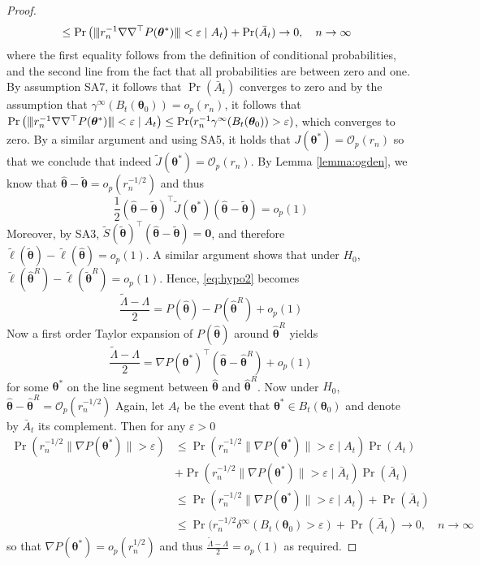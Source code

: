 \documentclass[11pt, a4paper]{article}
\newcommand*{\bb}{\boldsymbol}
\newcommand{\Op}[1]{\ensuremath{{\mathcal{O}_p(#1)}}}
\newcommand{\mnorms}[1]{{\vert\kern-0.25ex\vert\kern-0.25ex\vert #1 
		\vert\kern-0.25ex\vert\kern-0.25ex\vert}}
\theoremstyle{example} \newtheorem{example}{Example}[section]
\theoremstyle{theorem} \newtheorem{theorem}{Theorem}[section]
\theoremstyle{theorem }\newtheorem{proposition}{Proposition}[section]
\theoremstyle{theorem }\newtheorem{corollary}{Corollary}[section]
\def\\bbeta{\bb{\\bbeta}}
\def\btheta{\bb{\theta}}
\def\b0{\bb{0}}
\def\btnod{\bb{\theta}_0}
\def\bttilde{\tilde{\bb{\theta}}}
\begin{document}
\begin{proof}
\begin{equation}
\begin{aligned}
				&\leq 	\Pr\left(\mnorms{r_n^{-1}\nabla \nabla^\top P(\btheta^*)}<\varepsilon\mid A_t \right) + \Pr(\bar{A}_t) \to 0, \quad n \to \infty
			\end{aligned}
		\end{equation}
		where the first equality follows from the definition of conditional probabilities, and the second line from the fact that all probabilities are between zero and one. By assumption SA7, it follows that $\Pr(\bar{A}_t)$ converges to zero and by the assumption that $\gamma^\infty(B_t(\btnod)) = o_p(r_n)$, it follows that $\Pr\left(\mnorms{r_n^{-1}\nabla \nabla^\top P(\btheta^*)}<\varepsilon\mid A_t \right) \leq \Pr(r_n^{-1}\gamma^\infty(B_t(\btnod))>\varepsilon)$, which converges to zero. By a similar argument and using SA5, it holds that $J(\btheta^*) = \Op{r_n}$ so that we conclude that indeed $\tilde{J}(\btheta^*) = \Op{r_n}$. By Lemma \ref{lemma:ogden}, we know that $\hat{\btheta}-\bttilde = o_p(r_n^{-1/2})$ and thus 
		\begin{equation}
			\frac{1}{2} (\hat{\btheta}-\bttilde)^\top \tilde{J}(\btheta^*) (\hat{\btheta}-\bttilde) = o_p(1)
		\end{equation}
		Moreover, by SA3, $\tilde{S}(\bttilde)^\top(\hat{\btheta}-\bttilde) = \b0$, and therefore $	\tilde{\ell}(\tilde{\btheta}) - \tilde{\ell}(\hat{\btheta}) = o_p(1)$. A similar argument shows that under $H_0$, $\tilde{\ell}(\hat{\btheta}^R) - \tilde{\ell}(\tilde{\btheta}^R) =o_p(1)$. Hence, \eqref{eq:hypo2} becomes
		\begin{equation}
			\frac{\tilde{\Lambda}-\Lambda}{2} = P(\hat{\btheta})-P(\hat{\btheta}^R) + o_p(1)
		\end{equation}
		Now a first order Taylor expansion of $P(\hat{\btheta})$ around $\hat{\btheta}^R$ yields 
		\begin{equation}
			\frac{\tilde{\Lambda}-\Lambda}{2} = \nabla P(\btheta^*)^\top (\hat{\btheta}-\hat{\btheta}^R) + o_p(1)
		\end{equation}
		for some $\btheta^*$ on the line segment between $\hat{\btheta}$ and $\hat{\btheta}^R$. Now under $H_0$, $\hat{\btheta}-\hat{\btheta}^R = \Op{r_n^{-1/2}}$ Again, let $A_t$ be the event that $\btheta^* \in B_t(\btnod)$ and denote by $\bar{A}_t$ its complement. Then for any $\varepsilon>0$
		\begin{equation}
			\begin{aligned}
				\Pr(r_n^{-1/2}\|\nabla P(\btheta^*)  \| > \varepsilon) &\leq \Pr(r_n^{-1/2}\|\nabla P(\btheta^*)  \| > \varepsilon \mid A_t) \Pr(A_t) \\ 
				&+ \Pr(r_n^{-1/2}\|\nabla P(\btheta^*)  \| > \varepsilon \mid \bar{A}_t) \Pr(\bar{A}_t) \\ 
				& \leq \Pr(r_n^{-1/2}\|\nabla P(\btheta^*)  \| > \varepsilon \mid A_t) + \Pr(\bar{A}_t) \\ 
				& \leq \Pr( r_n^{-1/2}\delta^\infty(B_t(\btnod)>\varepsilon) + \Pr(\bar{A}_t) \to 0, \quad n \to \infty
			\end{aligned}
		\end{equation}
		so that $\nabla P(\btheta^*) = o_p(r_n^{1/2})$ and thus $\frac{\tilde{\Lambda}-\Lambda}{2} = o_p(1)$ as required. 
	\end{proof}
	
\end{document}
